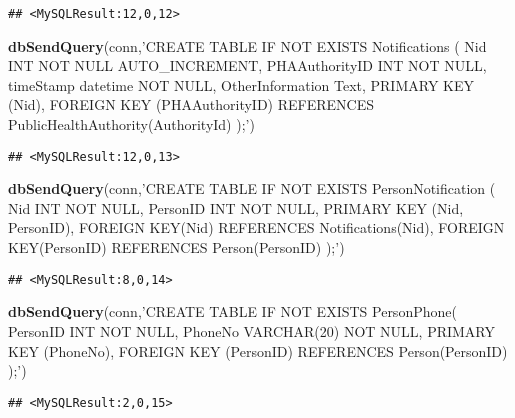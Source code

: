 \documentclass[
]{article}
\newenvironment{Shaded}{\begin{snugshade}}{\end{snugshade}}
\newcommand{\KeywordTok}[1]{\textcolor[rgb]{0.13,0.29,0.53}{\textbf{#1}}}
\newcommand{\NormalTok}[1]{#1}
\newcommand{\StringTok}[1]{\textcolor[rgb]{0.31,0.60,0.02}{#1}}
\begin{document}
\begin{verbatim}
## <MySQLResult:12,0,12>
\end{verbatim}

\begin{Shaded}
\begin{Highlighting}[]
\KeywordTok{dbSendQuery}\NormalTok{(conn,}\StringTok{'CREATE TABLE IF NOT EXISTS Notifications (}
\StringTok{  Nid INT NOT NULL AUTO_INCREMENT, }
\StringTok{  PHAAuthorityID INT NOT NULL, }
\StringTok{  timeStamp datetime NOT NULL, }
\StringTok{  OtherInformation Text, }
\StringTok{  PRIMARY KEY (Nid), }
\StringTok{  FOREIGN KEY (PHAAuthorityID) REFERENCES PublicHealthAuthority(AuthorityId)}
\StringTok{);'}\NormalTok{)}
\end{Highlighting}
\end{Shaded}

\begin{verbatim}
## <MySQLResult:12,0,13>
\end{verbatim}

\begin{Shaded}
\begin{Highlighting}[]
\KeywordTok{dbSendQuery}\NormalTok{(conn,}\StringTok{'CREATE TABLE IF NOT EXISTS PersonNotification (}
\StringTok{  Nid INT NOT NULL, }
\StringTok{  PersonID INT NOT NULL, }
\StringTok{  PRIMARY KEY (Nid, PersonID), }
\StringTok{  FOREIGN KEY(Nid) REFERENCES Notifications(Nid), }
\StringTok{  FOREIGN KEY(PersonID) REFERENCES Person(PersonID)}
\StringTok{);'}\NormalTok{)}
\end{Highlighting}
\end{Shaded}

\begin{verbatim}
## <MySQLResult:8,0,14>
\end{verbatim}

\begin{Shaded}
\begin{Highlighting}[]
\KeywordTok{dbSendQuery}\NormalTok{(conn,}\StringTok{'CREATE TABLE IF NOT EXISTS PersonPhone(}
\StringTok{  PersonID INT NOT NULL, }
\StringTok{  PhoneNo VARCHAR(20) NOT NULL, }
\StringTok{  PRIMARY KEY (PhoneNo), }
\StringTok{  FOREIGN KEY (PersonID) REFERENCES Person(PersonID)}
\StringTok{);'}\NormalTok{)}
\end{Highlighting}
\end{Shaded}

\begin{verbatim}
## <MySQLResult:2,0,15>
\end{verbatim}
\end{document}

